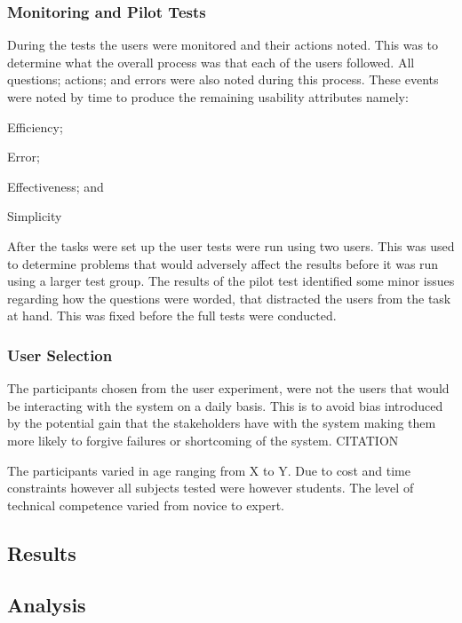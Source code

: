 \documentclass[12pt,a4paper]{report}
\begin{document}
\subsubsection{Monitoring and Pilot Tests}
During the tests the users were monitored and their actions noted. This was to
determine what the overall process was that each of the users followed. All
questions; actions; and errors were also noted during this process. These events
were noted by time to produce the remaining usability attributes namely:
\begin{inparaenum}[(i)]\item Efficiency; \item Error; \item Effectiveness; and \item
Simplicity  \end{inparaenum}

After the tasks were set up the user tests were run using two users. This was
used to determine problems that would adversely affect the results before it was
run using a larger test group. The results of the pilot test identified some
minor issues regarding how the questions were worded, that distracted the users
from the task at hand. This was fixed before the full tests were conducted.

\subsubsection{User Selection}
The participants chosen from the user experiment, were not the users that would
be interacting with the system on a daily basis. This is to avoid bias
introduced by the potential gain that the stakeholders have with the system
making them more likely to forgive failures or shortcoming of the system.
CITATION

The participants varied in age ranging from X to Y. Due to cost and time
constraints however all subjects tested were however students. The level of
technical competence varied from novice to expert. 

\subsection{Results}
\subsection{Analysis}


{}

\end{document}
